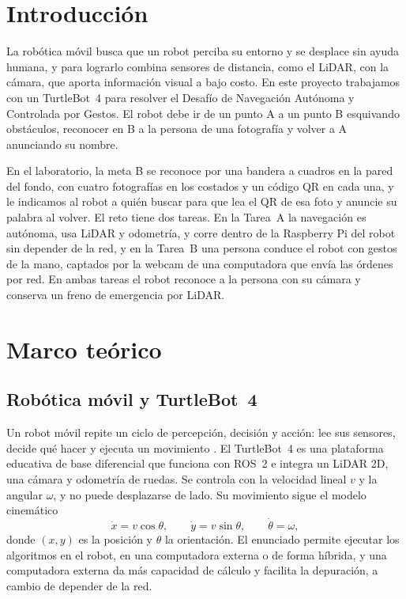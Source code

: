 \documentclass[11pt,a4paper]{article}
\begin{document}
\section{Introducción}

La robótica móvil busca que un robot perciba su entorno y se desplace sin ayuda humana, y para lograrlo combina sensores de distancia, como el LiDAR, con la cámara, que aporta información visual a bajo costo. En este proyecto trabajamos con un TurtleBot~4 para resolver el Desafío de Navegación Autónoma y Controlada por Gestos. El robot debe ir de un punto A a un punto B esquivando obstáculos, reconocer en B a la persona de una fotografía y volver a A anunciando su nombre.

En el laboratorio, la meta B se reconoce por una bandera a cuadros en la pared del fondo, con cuatro fotografías en los costados y un código QR en cada una, y le indicamos al robot a quién buscar para que lea el QR de esa foto y anuncie su palabra al volver. El reto tiene dos tareas. En la Tarea~A la navegación es autónoma, usa LiDAR y odometría, y corre dentro de la Raspberry Pi del robot sin depender de la red, y en la Tarea~B una persona conduce el robot con gestos de la mano, captados por la webcam de una computadora que envía las órdenes por red. En ambas tareas el robot reconoce a la persona con su cámara y conserva un freno de emergencia por LiDAR.

\section{Marco teórico}

\subsection{Robótica móvil y TurtleBot~4}

Un robot móvil repite un ciclo de percepción, decisión y acción: lee sus sensores, decide qué hacer y ejecuta un movimiento \cite{thrun2005}. El TurtleBot~4 es una plataforma educativa de base diferencial que funciona con ROS~2 e integra un LiDAR 2D, una cámara y odometría de ruedas. Se controla con la velocidad lineal $v$ y la angular $\omega$, y no puede desplazarse de lado. Su movimiento sigue el modelo cinemático
\begin{equation}
  \dot{x} = v\cos\theta, \qquad \dot{y} = v\sin\theta, \qquad \dot{\theta} = \omega,
\end{equation}
donde $(x, y)$ es la posición y $\theta$ la orientación. El enunciado permite ejecutar los algoritmos en el robot, en una computadora externa o de forma híbrida, y una computadora externa da más capacidad de cálculo y facilita la depuración, a cambio de depender de la red.
\end{document}
